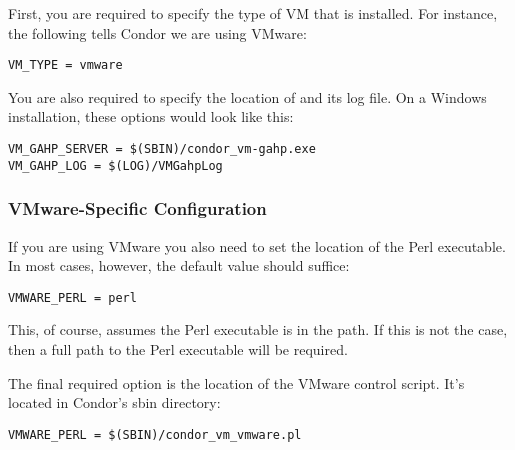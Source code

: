 First, you are required to specify the type of VM that is installed. 
For instance, the following tells Condor we are using VMware:

\begin{verbatim}
VM_TYPE = vmware
\end{verbatim}

You are also required to specify the location of  and
its log file.
On a Windows installation, these options would look like this:

\begin{verbatim}
VM_GAHP_SERVER = $(SBIN)/condor_vm-gahp.exe
VM_GAHP_LOG = $(LOG)/VMGahpLog
\end{verbatim}





\subsubsection{VMware-Specific Configuration}

If you are using VMware you also need to set the location of the Perl 
executable.  In most cases, however, the default value should suffice:

\begin{verbatim}
VMWARE_PERL = perl
\end{verbatim}

This, of course, assumes the Perl executable is in the path.  If this is not 
the case, then a full path to the Perl executable will be required.

The final required option is the location of the VMware control script. It's
located in Condor's sbin directory:

\begin{verbatim}
VMWARE_PERL = $(SBIN)/condor_vm_vmware.pl
\end{verbatim}

